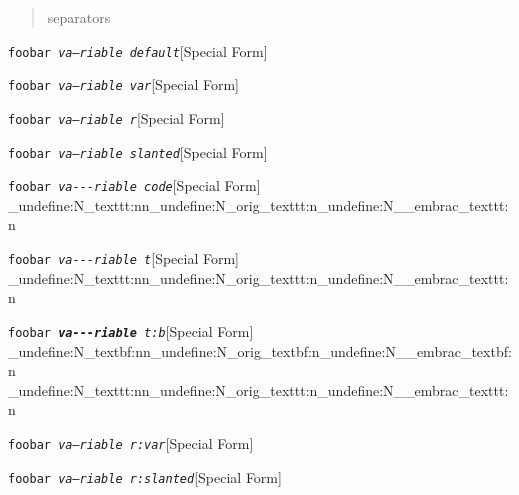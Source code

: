 \documentclass{book}
\newcommand\GNUTexinfocommandstyletextvar[1]{{\normalfont{}\textsl{#1}}}%
\begin{document}
%
\begin{quote}
\unskip{\parskip=0pt\noindent}%
separators
\end{quote}

\noindent\texttt{foobar \EmbracOn{}\textnormal{\textsl{va---riable default}}\EmbracOff{}}\hfill[Special Form]

%
\noindent\texttt{foobar \EmbracOn{}\textnormal{\textsl{\GNUTexinfocommandstyletextvar{va---riable} var}}\EmbracOff{}}\hfill[Special Form]

%
\noindent\texttt{foobar \EmbracOn{}\textnormal{\textsl{\EmbracOff{}\textnormal{va---riable}\EmbracOn{} r}}\EmbracOff{}}\hfill[Special Form]

%
\noindent\texttt{foobar \EmbracOn{}\textnormal{\textsl{\textsl{va---riable} slanted}}\EmbracOff{}}\hfill[Special Form]

%
\noindent\texttt{foobar \EmbracOn{}\textnormal{\textsl{\texttt{va{-}{-}{-}riable} code}}\EmbracOff{}}\hfill[Special Form]
\ExplSyntaxOn%
\cs_undefine:N{\embrac_texttt:nn}\cs_undefine:N{\embrac_orig_texttt:n}\cs_undefine:N{\__embrac_texttt:n}%
\ExplSyntaxOff%

%
\noindent\texttt{foobar \EmbracOn{}\textnormal{\textsl{\texttt{va{-}{-}{-}riable} t}}\EmbracOff{}}\hfill[Special Form]
\ExplSyntaxOn%
\cs_undefine:N{\embrac_texttt:nn}\cs_undefine:N{\embrac_orig_texttt:n}\cs_undefine:N{\__embrac_texttt:n}%
\ExplSyntaxOff%

%
\noindent\texttt{foobar \EmbracOn{}\textnormal{\textsl{\texttt{\textbf{va{-}{-}{-}riable}} t:b}}\EmbracOff{}}\hfill[Special Form]
\ExplSyntaxOn%
\cs_undefine:N{\embrac_textbf:nn}\cs_undefine:N{\embrac_orig_textbf:n}\cs_undefine:N{\__embrac_textbf:n}%
\cs_undefine:N{\embrac_texttt:nn}\cs_undefine:N{\embrac_orig_texttt:n}\cs_undefine:N{\__embrac_texttt:n}%
\ExplSyntaxOff%

%
\noindent\texttt{foobar \EmbracOn{}\textnormal{\textsl{\EmbracOff{}\textnormal{\GNUTexinfocommandstyletextvar{va---riable}}\EmbracOn{} r:var}}\EmbracOff{}}\hfill[Special Form]

%
\noindent\texttt{foobar \EmbracOn{}\textnormal{\textsl{\EmbracOff{}\textnormal{\textsl{va---riable}}\EmbracOn{} r:slanted}}\EmbracOff{}}\hfill[Special Form]
\end{document}
